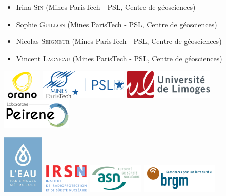 \documentclass{article}
\begin{document}
\begin{itemize}
    \item Irina \textsc{Sin} (Mines ParisTech - PSL, Centre de géosciences) 
    \item Sophie \textsc{Guillon} (Mines ParisTech - PSL, Centre de géosciences) 
    \item Nicolas \textsc{Seigneur} (Mines ParisTech - PSL, Centre de géosciences) 
    \item Vincent \textsc{Lagneau} (Mines ParisTech - PSL, Centre de géosciences) 
\end{itemize}


\vspace{1cm}
\begin{center}
\includegraphics[height = 40pt]{oranologo.png}
\hspace{0.3em}
\includegraphics[height = 40pt ]{logoMPT.png}
\hspace{0.3em}
\includegraphics[height = 40pt ]{logoUNILIM.png}
\hspace{0.3em}
\includegraphics[height = 40pt ]{Logo-PEIRENE.png}

\vspace{0.5 cm}
\includegraphics[height = 80pt ]{logoeaulimoges.png}
\hspace{0.3em}
\includegraphics[height = 40pt ]{logoIRSN.png} 
\hspace{0.3em}
\includegraphics[height = 40pt]{logo_ASN.png}
\hspace{0.3em}
\includegraphics[height = 40pt]{logo_BRGM.png}


\end{center}
\end{document}
